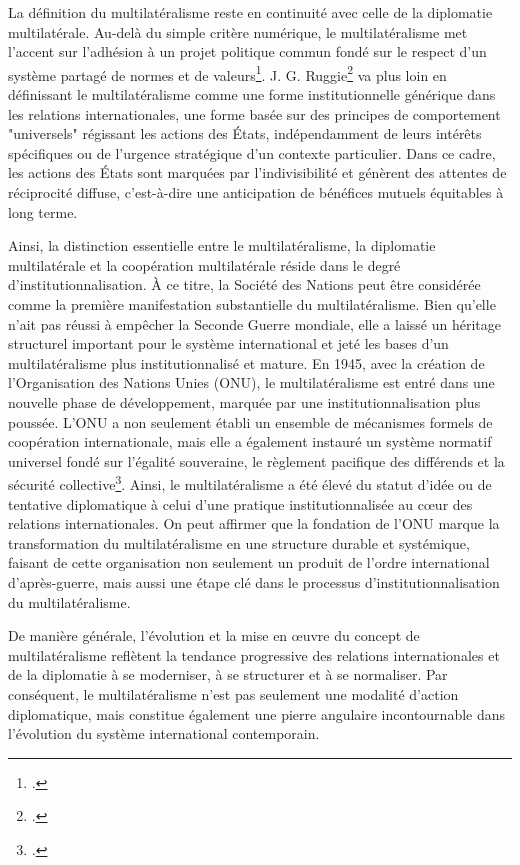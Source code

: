 \documentclass[a4paper,twoside,12pt]{book}
\begin{document}
La définition du multilatéralisme reste en continuité avec celle de la diplomatie multilatérale. Au-delà du simple critère numérique, le multilatéralisme met l'accent sur l'adhésion à un projet politique commun fondé sur le respect d'un système partagé de normes et de valeurs\footcite{library}. J. G. Ruggie\footcite[p.571]{ruggie1992} va plus loin en définissant le multilatéralisme comme une forme institutionnelle générique dans les relations internationales, une forme basée sur des principes de comportement "universels" régissant les actions des États, indépendamment de leurs intérêts spécifiques ou de l'urgence stratégique d'un contexte particulier. Dans ce cadre, les actions des États sont marquées par l'indivisibilité et génèrent des attentes de réciprocité diffuse, c'est-à-dire une anticipation de bénéfices mutuels équitables à long terme.

Ainsi, la distinction essentielle entre le multilatéralisme, la diplomatie multilatérale et la coopération multilatérale réside dans le degré d'institutionnalisation. À ce titre, la Société des Nations peut être considérée comme la première manifestation substantielle du multilatéralisme. Bien qu'elle n'ait pas réussi à empêcher la Seconde Guerre mondiale, elle a laissé un héritage structurel important pour le système international et jeté les bases d'un multilatéralisme plus institutionnalisé et mature. En 1945, avec la création de l'Organisation des Nations Unies (ONU), le multilatéralisme est entré dans une nouvelle phase de développement, marquée par une institutionnalisation plus poussée. L'ONU a non seulement établi un ensemble de mécanismes formels de coopération internationale, mais elle a également instauré un système normatif universel fondé sur l'égalité souveraine, le règlement pacifique des différends et la sécurité collective\footcite{nationsa}. Ainsi, le multilatéralisme a été élevé du statut d'idée ou de tentative diplomatique à celui d'une pratique institutionnalisée au cœur des relations internationales. On peut affirmer que la fondation de l'ONU marque la transformation du multilatéralisme en une structure durable et systémique, faisant de cette organisation non seulement un produit de l'ordre international d'après-guerre, mais aussi une étape clé dans le processus d'institutionnalisation du multilatéralisme.

De manière générale, l'évolution et la mise en œuvre du concept de multilatéralisme reflètent la tendance progressive des relations internationales et de la diplomatie à se moderniser, à se structurer et à se normaliser. Par conséquent, le multilatéralisme n'est pas seulement une modalité d'action diplomatique, mais constitue également une pierre angulaire incontournable dans l'évolution du système international contemporain.
\end{document}
